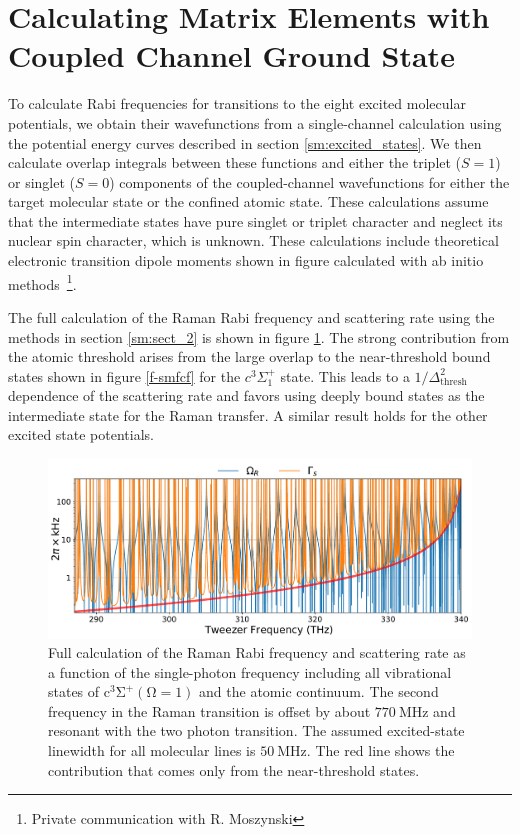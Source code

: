 \documentclass[aps,prx,secnumarabic,amsmath,amssymb,10pt,superscriptaddress]{revtex4-2}
\begin{document}
\section{Calculating Matrix Elements with Coupled Channel Ground State}
To calculate Rabi frequencies for transitions to the eight excited molecular potentials, we
obtain their wavefunctions from a single-channel calculation \cite{Fattal1996} using the potential energy curves described in section \ref{sm:excited_states}. We
then calculate overlap integrals between these functions and either the triplet ($S=1$) or singlet ($S=0$) components of the
coupled-channel wavefunctions for either the target molecular state or the confined atomic state.
These calculations assume that the intermediate states have pure singlet or triplet character and neglect its
nuclear spin character, which is unknown. These calculations include theoretical electronic transition dipole moments shown in figure  calculated with ab initio methods~\footnote{Private communication with R. Moszynski}.

The full calculation of the Raman Rabi frequency and scattering rate using the methods in section \ref{sm:sect_2} is shown in figure \ref{f-sm}. The strong contribution from the atomic threshold arises from the large overlap to the near-threshold bound states shown in figure \ref{f-smfcf} for the $c^3\Sigma^+_1$ state. This leads to a $1/\Delta_{\text{thresh}}^2$ dependence of the scattering rate and favors using deeply bound states as the intermediate state for the Raman transfer. A similar result holds for the other excited state potentials.

\begin{figure}[ht!]
  \includegraphics[width=\textwidth]{imgs/raman_theory_full.pdf}
  \caption{Full calculation of the Raman Rabi frequency and scattering rate
    as a function of the single-photon frequency
    including all vibrational states of $ \mathrm{c^3\Sigma^+(\Omega = 1)}$
    and the atomic continuum.
    The second frequency in the Raman transition is offset by about $770~\mathrm{MHz}$
    and resonant with the two photon transition.
    The assumed excited-state linewidth for all molecular lines is $50~\text{MHz}$.
    The red line shows the contribution that comes only from the near-threshold states.
    \label{f-sm}}
\end{figure}
\end{document}
